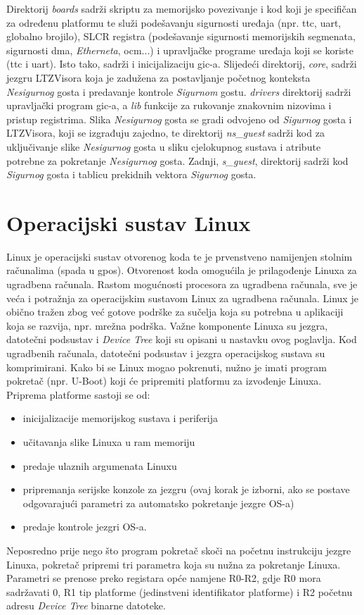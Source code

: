 \documentclass[times, utf8, diplomski, numeric]{fer}
\begin{document}
Direktorij \textit{boards} sadrži skriptu za memorijsko povezivanje i kod koji je specifičan za određenu platformu te služi
podešavanju sigurnosti uređaja (npr. \gls{ttc}, \gls{uart}, globalno brojilo), SLCR registra (podešavanje sigurnosti memorijskih
segmenata, sigurnosti \gls{dma}, \textit{Etherneta}, \gls{ocm}...) i upravljačke programe uređaja koji se koriste (\gls{ttc} i \gls{uart}). Isto tako,
sadrži i inicijalizaciju \gls{gic}-a. Slijedeći direktorij, \textit{core}, sadrži jezgru LTZVisora koja je zadužena za postavljanje
početnog konteksta \textit{Nesigurnog} gosta i predavanje kontrole \textit{Sigurnom} gostu. \textit{drivers} direktorij sadrži upravljački
program \gls{gic}-a, a \textit{lib} funkcije za rukovanje znakovnim nizovima i pristup registrima. Slika \textit{Nesigurnog} gosta se gradi
odvojeno od \textit{Sigurnog} gosta i LTZVisora, koji se izgrađuju zajedno, te direktorij \textit{ns\_guest} sadrži kod za uključivanje
slike \textit{Nesigurnog} gosta u sliku cjelokupnog sustava i atribute potrebne za pokretanje \textit{Nesigurnog} gosta. Zadnji,
\textit{s\_guest}, direktorij sadrži kod \textit{Sigurnog} gosta i tablicu prekidnih vektora \textit{Sigurnog} gosta.

\chapter{Operacijski sustav Linux}
Linux je operacijski sustav otvorenog koda te je prvenstveno namijenjen stolnim računalima (spada u \gls{gpos}).
Otvorenost koda omogućila je prilagođenje Linuxa za ugradbena računala.
Rastom mogućnosti procesora za ugradbena računala, sve je veća i potražnja za operacijskim sustavom Linux za ugradbena
računala. Linux je obično tražen zbog već gotove podrške za sučelja koja su potrebna u aplikaciji koja se razvija, npr.
mrežna podrška. Važne komponente Linuxa su jezgra, datotečni podsustav i \textit{Device Tree} koji su opisani u nastavku
ovog poglavlja. Kod ugradbenih računala, datotečni podsustav i jezgra operacijskog sustava su komprimirani.
Kako bi se Linux mogao pokrenuti, nužno je imati program pokretač (npr. U-Boot) koji će pripremiti platformu za izvođenje
Linuxa. Priprema platforme sastoji se od:
\begin{itemize}
  \item{inicijalizacije memorijskog sustava i periferija}
  \item{učitavanja slike Linuxa u \gls{ram} memoriju}
  \item{predaje ulaznih argumenata Linuxu}
  \item{pripremanja serijske konzole za jezgru (ovaj korak je izborni, ako se postave odgovarajući parametri za automatsko
  pokretanje jezgre OS-a)}
  \item{predaje kontrole jezgri OS-a.}
\end{itemize}
Neposredno prije nego što program pokretač skoči na početnu instrukciju jezgre Linuxa, pokretač
pripremi tri parametra koja su nužna za pokretanje Linuxa. Parametri se prenose preko registara opće namjene R0-R2, gdje
R0 mora sadržavati 0, R1 tip platforme (jedinstveni identifikator platforme) i R2 početnu adresu \textit{Device Tree} binarne
datoteke.
\end{document}
